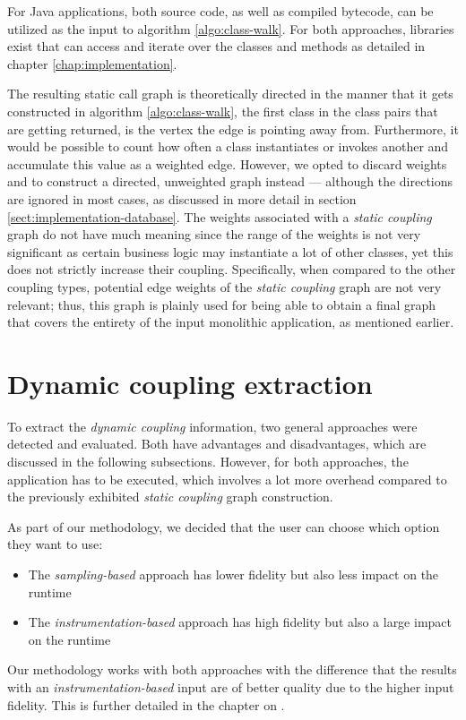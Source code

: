 \documentclass[12pt,a4paper]{report}
\begin{document}
For Java applications, both source code, as well as compiled bytecode, can be
utilized as the input to algorithm \ref{algo:class-walk}. For both approaches,
libraries exist that can access and iterate over the classes and methods as
detailed in chapter \ref{chap:implementation}.

The resulting static call graph is theoretically directed in the manner that it
gets constructed in algorithm \ref{algo:class-walk}, the first class in the
class pairs that are getting returned, is the vertex the edge is pointing away
from. Furthermore, it would be possible to count how often a class instantiates
or invokes another and accumulate this value as a weighted edge. However, we
opted to discard weights and to construct a directed, unweighted graph
instead --- although the directions are ignored in most cases, as discussed in
more detail in section \ref{sect:implementation-database}. The weights
associated with a \textit{static coupling} graph do not have much meaning since
the range of the weights is not very significant as certain business logic may
instantiate a lot of other classes, yet this does not strictly increase their
coupling. Specifically, when compared to the other coupling types, potential
edge weights of the \textit{static coupling} graph are not very relevant; thus,
this graph is plainly used for being able to obtain a final graph that covers
the entirety of the input monolithic application, as mentioned earlier.



\section{Dynamic coupling extraction} \label{sect:dynamic-coupling-extraction}

To extract the \textit{dynamic coupling} information, two general approaches
were detected and evaluated. Both have advantages and disadvantages, which are
discussed in the following subsections. However, for both approaches, the
application has to be executed, which involves a lot more overhead compared to
the previously exhibited \textit{static coupling} graph construction.

As part of our methodology, we decided that the user can choose which option
they want to use:
\begin{itemize}[noitemsep]
  \item The \textit{sampling\hyp based} approach has lower fidelity but
        also less impact on the runtime
  \item The \textit{instrumentation\hyp based} approach has high fidelity but
        also a large impact on the runtime
\end{itemize}
Our methodology works with
both approaches with the difference that the results with an \textit{
instrumentation\hyp based} input are of better quality due to the higher input
fidelity. This is further detailed in the chapter on
\textit{}.
\end{document}
